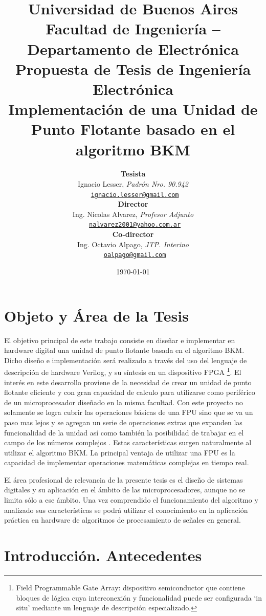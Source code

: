 \documentclass[a4paper]{article}
\title{
   {\normalsize
      Universidad de Buenos Aires\\
      Facultad de Ingeniería -- Departamento de Electrónica\\
      Propuesta de Tesis de Ingeniería Electrónica\\
      \vspace{0.7cm}
   }
   Implementación de una Unidad de Punto Flotante basado en el algoritmo BKM
}
\author{ \textbf{Tesista}                                                           \\
         Ignacio Lesser, \textit{Padrón Nro. 90.942}                                \\
         \texttt{ \href{mailto:ignacio.lesser@gmail.com}{ignacio.lesser@gmail.com}}  \\[2.5ex]
         \textbf{Director}                                                          \\
         Ing. Nicolas Alvarez, \textit{Profesor Adjunto}                            \\
         \texttt{ \href{mailto:nalvarez2001@yahoo.com.ar}{nalvarez2001@yahoo.com.ar}} \\[2.5ex]
         \textbf{Co-director}                                                       \\
         Ing. Octavio Alpago, \textit{JTP. Interino}                                \\
         \texttt{ \href{mailto:oalpago@gmail.com}{oalpago@gmail.com}}               \\[2.5ex]
       }
\date{\today}
\begin{document}
\maketitle



\thispagestyle{fancy}

\section{Objeto y Área de la Tesis}

El objetivo principal de este trabajo consiste en diseñar e implementar en hardware digital una unidad de punto flotante basada en el algoritmo BKM. Dicho diseño e implementación será realizado a través del uso del lenguaje de descripción de hardware Verilog, y su síntesis en un dispositivo FPGA \footnote{\label{FPGA}Field Programmable Gate Array: dispositivo semiconductor que contiene bloques de lógica cuya interconexión y funcionalidad puede ser configurada `in situ' mediante un lenguaje de descripción especializado.}.
El interés en este desarrollo proviene de la necesidad de crear un unidad de punto flotante eficiente y con gran capacidad de calculo para utilizarse como periférico de un microprocesador diseñado en la misma facultad. Con este proyecto no solamente se logra cubrir las operaciones básicas de una FPU sino que se va un paso mas lejos y se agregan un serie de operaciones extras que expanden las funcionalidad de la unidad así como también la posibilidad de trabajar en el campo de los números
complejos . Estas características surgen naturalmente al utilizar el algoritmo BKM.
La principal ventaja de utilizar una FPU es la capacidad de implementar operaciones matemáticas complejas en tiempo real.

El área profesional de relevancia de la presente tesis es el diseño de sistemas digitales y su aplicación en el ámbito de las microprocesadores, aunque no se limita sólo a ese ámbito. Una vez comprendido el funcionamiento del algoritmo y analizado sus características se podrá utilizar el conocimiento en la aplicación práctica en hardware de algoritmos de procesamiento de señales en general.

\newpage

\section{Introducción. Antecedentes}
\end{document}
